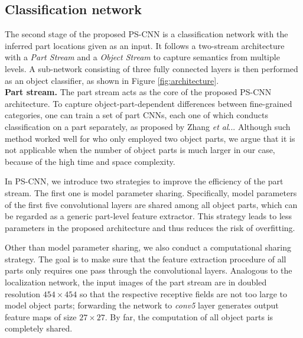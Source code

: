 \documentclass[10pt,twocolumn,letterpaper]{article}
\makeatletter
\DeclareRobustCommand\onedot{\futurelet\@let@token\@onedot}
\def\@onedot{\ifx\@let@token.\else.\null\fi\xspace}
\def\etal{\emph{et al}\onedot}
\makeatother
\begin{document}
\subsection{Classification network}\label{subsec:classification}
The second stage of the proposed PS-CNN is a classification network with the inferred part locations given as an input. It follows a two-stream architecture with a \emph{Part Stream} and a \emph{Object Stream} to capture semantics from multiple levels. A sub-network consisting of three fully connected layers is then performed as an object classifier, as shown in Figure \ref{fig:architecture}. \\

\noindent\textbf{Part stream.}
The part stream acts as the core of the proposed PS-CNN architecture. To capture object-part-dependent differences between fine-grained categories, one can train a set of part CNNs, each one of which conducts classification on a part separately, as proposed by Zhang \etal \cite{zhang2014part}. Although such method worked well for \cite{zhang2014part} who only employed two object parts, we argue that it is not applicable when the number of object parts is much larger in our case, because of the high time and space complexity.



In PS-CNN, we introduce two strategies to improve the efficiency of the part stream. The first one is model parameter sharing. Specifically, model parameters of the first five convolutional layers are shared among all object parts, which can be regarded as a generic part-level feature extractor. This strategy leads to less parameters in the proposed architecture and thus reduces the risk of overfitting.







Other than model parameter sharing, we also conduct a computational sharing strategy. The goal is to make sure that the feature extraction procedure of all parts only requires one pass through the convolutional layers. Analogous to the localization network, the input images of the part stream are in doubled resolution $454\times454$ so that the respective receptive fields are not too large to model object parts; forwarding the network to \textit{conv5} layer generates output feature maps of size $27\times 27$. By far, the computation of all object parts is completely shared.
\end{document}
